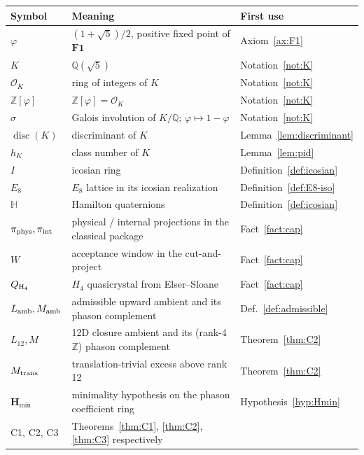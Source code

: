 \documentclass[11pt, a4paper]{amsart}
\theoremstyle{definition}
\newcommand{\Q}{\mathbb{Q}}
\newcommand{\Z}{\mathbb{Z}}
\newcommand{\HH}{\mathbb{H}}
\newcommand{\disc}{\operatorname{disc}}
\newcommand{\Hmin}{\mathbf{H}_{\min}}
\newcommand{\Ophi}{\mathbb{Z}[\varphi]}
\begin{document}
\begin{center}
\begin{tabular}{|l|l|l|}
\hline
Symbol & Meaning & First use \\
\hline
$\varphi$ & $(1+\sqrt 5)/2$, positive fixed point of
$\mathbf{F1}$ & Axiom~\ref{ax:F1} \\
$K$ & $\Q(\sqrt 5)$ & Notation~\ref{not:K} \\
$\mathcal O_K$ & ring of integers of $K$ & Notation~\ref{not:K} \\
$\Ophi$ & $\Z[\varphi] = \mathcal O_K$ & Notation~\ref{not:K} \\
$\sigma$ & Galois involution of $K/\Q$; $\varphi \mapsto 1-\varphi$ &
  Notation~\ref{not:K} \\
$\disc(K)$ & discriminant of $K$ & Lemma~\ref{lem:discriminant} \\
$h_K$ & class number of $K$ & Lemma~\ref{lem:pid} \\
$I$ & icosian ring & Definition~\ref{def:icosian} \\
$E_8$ & $E_8$ lattice in its icosian realization &
  Definition~\ref{def:E8-iso} \\
$\HH$ & Hamilton quaternions & Definition~\ref{def:icosian} \\
$\pi_{\rm phys}, \pi_{\rm int}$ & physical / internal projections
  in the classical package & Fact~\ref{fact:cap} \\
$W$ & acceptance window in the cut-and-project & Fact~\ref{fact:cap} \\
$Q_{\rm H_4}$ & $H_4$ quasicrystal from Elser--Sloane &
  Fact~\ref{fact:cap} \\
$L_{\rm amb}, M_{\rm amb}$ & admissible upward ambient and its phason
  complement & Def.~\ref{def:admissible} \\
$L_{12}, M$ & 12D closure ambient and its (rank-4 $\Z$) phason
  complement & Theorem~\ref{thm:C2} \\
$M_{\rm trans}$ & translation-trivial excess above rank 12 &
  Theorem~\ref{thm:C2} \\
$\Hmin$ & minimality hypothesis on the phason coefficient ring &
  Hypothesis~\ref{hyp:Hmin} \\
C1, C2, C3 & Theorems~\ref{thm:C1}, \ref{thm:C2}, \ref{thm:C3}
  respectively & \\
\hline
\end{tabular}
\end{center}
\end{document}

